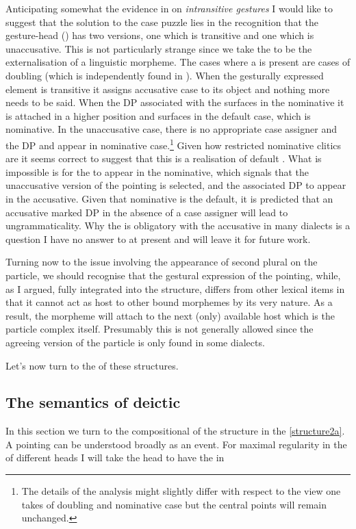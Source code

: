 \documentclass[output=paper]{LSP/langsci}
\begin{document}
Anticipating somewhat the evidence in  on \textit{intransitive gestures} I would like to suggest that the solution to the case puzzle lies in the recognition that the gesture-head (\xspace\Pointinghand) has two versions, one which is transitive and one which is unaccusative.  This is not particularly strange since we take the  to be the externalisation of a linguistic morpheme.  The cases where a  is present are cases of  doubling (which is independently found in ). 
When the gesturally expressed element is transitive it assigns accusative case to its object and nothing more needs to be said. When the DP associated with the  surfaces in the nominative it is attached in a higher position and surfaces in the default case, which is nominative.  In the unaccusative case, there is no appropriate case assigner and the DP and  appear in nominative case.\footnote{The details of the analysis might slightly differ with respect to the view one takes of  doubling and nominative case but the central points will remain unchanged.}  Given how restricted nominative clitics are it seems correct to suggest that this is a realisation of default .  What is impossible is for the  to appear in the nominative, which signals that the unaccusative version of the pointing is selected, and the associated DP to appear in the accusative.  Given that nominative is the default, it is predicted that an accusative marked DP in the absence of a case assigner will lead to ungrammaticality.  Why the  is obligatory with the accusative in many dialects is a {question} I have no answer to at present and will leave it for future work.

Turning now to the  issue involving the appearance of second  plural  on the particle, we should recognise that the gestural expression of the pointing, while, as I argued, fully integrated into the structure, differs from other lexical items in that it cannot act as host to other bound morphemes by its very nature.  As a result, the  morpheme will attach to the next (only) available host which is the particle complex itself.  Presumably this is not generally allowed since the agreeing version of the particle is only found in some dialects.
 

 Let's now turn to the  of these structures. 

\subsection{The semantics of deictic \na}
In this section we turn to the compositional  of the structure in
the \ref{structure2a}.  A pointing  can be understood broadly as an event.  For maximal regularity in the  of different heads I will take the  head to have the  in \Next
\end{document}
